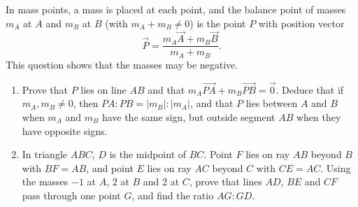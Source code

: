 In mass points, a mass is placed at each point, and the balance point of masses $m_A$ at $A$ and $m_B$ at $B$ (with $m_A+m_B\ne0$) is the point $P$ with position vector
\[\vec P=\dfrac{m_A\vec A+m_B\vec B}{m_A+m_B}.\]
This question shows that the masses may be negative.
\begin{enumerate}
\item[(a)] Prove that $P$ lies on line $AB$ and that $m_A\overrightarrow{PA}+m_B\overrightarrow{PB}=\vec0$. Deduce that if $m_A,m_B\ne0$, then $PA:PB=|m_B|:|m_A|$, and that $P$ lies between $A$ and $B$ when $m_A$ and $m_B$ have the same sign, but outside segment $AB$ when they have opposite signs.
\item[(b)] In triangle $ABC$, $D$ is the midpoint of $BC$. Point $F$ lies on ray $AB$ beyond $B$ with $BF=AB$, and point $E$ lies on ray $AC$ beyond $C$ with $CE=AC$. Using the masses $-1$ at $A$, $2$ at $B$ and $2$ at $C$, prove that lines $AD$, $BE$ and $CF$ pass through one point $G$, and find the ratio $AG:GD$.
\end{enumerate}
